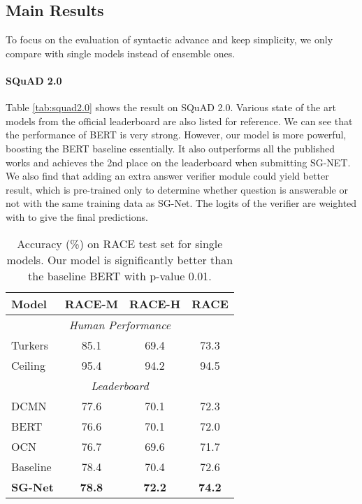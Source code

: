 \documentclass[letterpaper]{article} \usepackage{color}
\begin{document}
\subsection{Main Results}

To focus on the evaluation of syntactic advance and keep simplicity, we only compare with single models instead of ensemble ones.

\paragraph{SQuAD 2.0}



Table \ref{tab:squad2.0} shows the result on SQuAD 2.0. Various state of the art models from the official leaderboard are also listed for reference. We can see that the performance of BERT is very strong. However, our model is more powerful, boosting the BERT baseline essentially. It also outperforms all the published works and achieves the 2nd place on the leaderboard when submitting SG-NET. We also find that adding an extra answer verifier module could yield better result, which is pre-trained only to determine whether question is answerable or not with the same training data as SG-Net. The logits of the verifier are weighted with  to give the final predictions.

\begin{table}
	\centering
	{
		\begin{tabular}{l c c c}
			\hline
			\hline
			\textbf{Model} &   \textbf{RACE-M}  & \textbf{RACE-H} & \textbf{RACE}	\\
			\hline
			\multicolumn{4}{c}{\emph{Human Performance}} \\
			Turkers  & 85.1 & 69.4 & 73.3\\
			Ceiling  & 95.4 & 94.2& 94.5 \\
			\hline
			\multicolumn{4}{c}{\emph{Leaderboard}} \\
			DCMN  & 77.6 & 70.1  & 72.3\\
			BERT 	& 	76.6 & 70.1 & 72.0  \\
			OCN  & 76.7 & 69.6 & 71.7  \\ 
			\hline
			Baseline & 78.4 & 70.4& 72.6 \\
			\textbf{SG-Net} & \textbf{78.8} & \textbf{72.2} & \textbf{74.2}\\
			\hline
			\hline
		\end{tabular}
	}
	\caption{\label{tab:race} Accuracy (\%) on RACE test set for single models. Our model is significantly better than the baseline BERT with p-value  0.01.}
\end{table}
\end{document}
